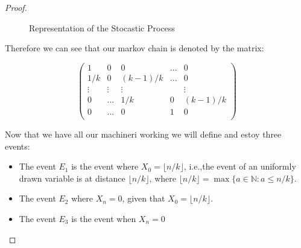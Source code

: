 \begin{theorem}
\begin{proof}
\begin{figure}[H]
  \centering
  
  
  \caption{Representation of the Stocastic Process}
\end{figure}


Therefore we can see that our markov chain is denoted by the matrix:

$$
\begin{pmatrix}
  1 & 0 & 0& ... & 0\\
  1/k & 0 & (k-1)/k & ... & 0\\
  \vdots & \vdots & \vdots & & \vdots\\
  0 & ... & 1/k & 0 & (k-1)/k\\
  0 & ... & 0 & 1 & 0\\
  
\end{pmatrix}
$$

Now that we have all our machineri working we will define and estoy three events:

\begin{itemize}
\item The event $E_1$ is the event where $X_0 = \lfloor n/k\rfloor$, i.e.,the event of an uniformly drawn variable is at distance $\lfloor n/k\rfloor$, where $\lfloor n/k\rfloor = \max\{a \in \mathbb{N}: a \le n/k \}$. 
\item The event $E_2$ where $X_n = 0$, given that $X_0= \lfloor n/k\rfloor$.

\item The event $E_3$ is the event when $X_n = 0$
\end{itemize}



\end{proof}
\end{theorem}
